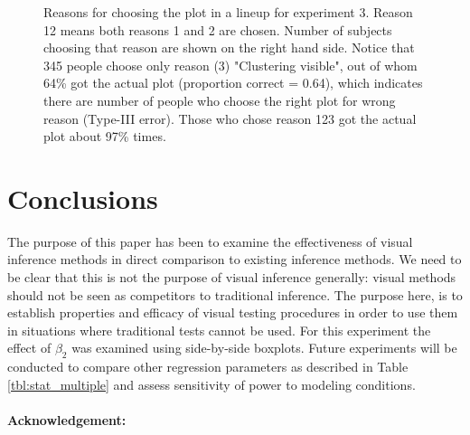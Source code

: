 \documentclass{article}
\begin{document}
\begin{figure}[hbtp]
   \centering
       \caption{Reasons for choosing the plot in a lineup for experiment 3. Reason 12 means both reasons 1 and 2 are chosen. Number of subjects choosing that reason are shown on the right hand side. Notice that 345 people choose only reason (3) "Clustering visible", out of whom 64\% got the actual plot (proportion correct = 0.64), which indicates there are number of people who choose the right plot for wrong reason (Type-III error). Those who chose reason 123 got the actual plot about 97\% times.}
       \label{fig:choice_reason}
\end{figure}


\section{Conclusions}

The purpose of this paper has been to examine the effectiveness of visual inference methods in direct comparison to existing inference methods. We need to be clear that this is not the purpose of visual inference generally: visual methods should not be seen as competitors to traditional inference.  The purpose here, is to  establish properties and  efficacy of visual testing procedures in order to use them in situations where traditional tests cannot be used. For this experiment the effect of $\beta_2$ was examined using side-by-side boxplots. Future experiments will be conducted to compare other regression parameters as described in Table \ref{tbl:stat_multiple} and assess sensitivity of power to modeling conditions.

\paragraph{Acknowledgement:}
\end{document}
